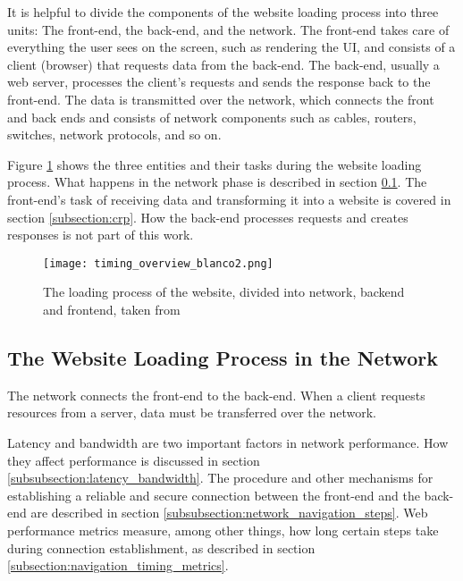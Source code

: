 
It is helpful to divide the components of the website loading process into three units: The front-end, the back-end, and the network. %
The front-end takes care of everything the user sees on the screen, such as rendering the UI, and consists of a client (browser) that requests data from the back-end.
The back-end, usually a web server, processes the client's requests and sends the response back to the front-end.
The data is transmitted over the network, which connects the front and back ends and consists of network components such as cables, routers, switches, network protocols, and so on.

Figure \ref{figure:timing_overview} shows the three entities and their tasks during the website loading process.
What happens in the network phase is described in section \ref{subsection:network_process}.
The front-end's task of receiving data and transforming it into a website is covered in section \ref{subsection:crp}.
How the back-end processes requests and creates responses is not part of this work.

\begin{figure}[h!]
\begin{center}
\texttt{[image: timing\_overview\_blanco2.png]}
\caption[The loading process of the website, divided into network, backend and frontend.]{The loading process of the website, divided into network, backend and frontend, taken from \cite{2012W3CNavigationTiming}}
\label{figure:timing_overview}
\end{center}
\end{figure}





\subsection{The Website Loading Process in the Network} %
\label{subsection:network_process}

The network connects the front-end to the back-end.
When a client requests resources from a server, data must be transferred over the network.

Latency and bandwidth are two important factors in network performance.
How they affect performance is discussed in section \ref{subsubsection:latency_bandwidth}.
The procedure and other mechanisms for establishing a reliable and secure connection between the front-end and the back-end are described in section \ref{subsubsection:network_navigation_steps}.
Web performance metrics measure, among other things, how long certain steps take during connection establishment, as described in section \ref{subsection:navigation_timing_metrics}.


